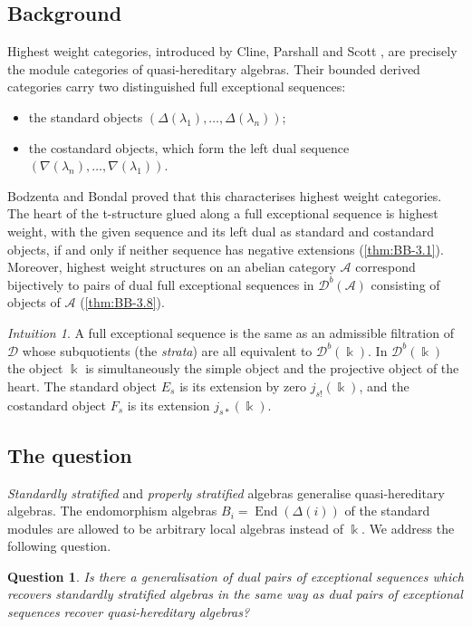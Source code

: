 \documentclass[11pt,reqno]{amsart}
\theoremstyle{plain}
\newtheorem{question}[theorem]{Question}
\theoremstyle{definition}
\theoremstyle{remark}
\newtheorem*{intuition}{Intuition}
\newcommand{\kk}{\Bbbk}
\DeclareMathOperator{\End}{End}
\newcommand{\Db}{\mathcal{D}^b}
\newcommand{\cD}{\mathcal{D}}
\newcommand{\cA}{\mathcal{A}}
\begin{document}
\subsection{Background}
Highest weight categories, introduced by Cline, Parshall and Scott \cite{CPS88}, are precisely the module categories of quasi-hereditary algebras. Their bounded derived categories carry two distinguished full exceptional sequences:
\begin{itemize}
\item the standard objects $(\Delta(\lambda_1),\dots,\Delta(\lambda_n))$;
\item the costandard objects, which form the left dual sequence $(\nabla(\lambda_n),\dots,\nabla(\lambda_1))$.
\end{itemize}
Bodzenta and Bondal \cite{BB26} proved that this characterises highest weight categories. The heart of the t-structure glued along a full exceptional sequence is highest weight, with the given sequence and its left dual as standard and costandard objects, if and only if neither sequence has negative extensions (\cref{thm:BB-3.1}). Moreover, highest weight structures on an abelian category $\cA$ correspond bijectively to pairs of dual full exceptional sequences in $\Db(\cA)$ consisting of objects of $\cA$ (\cref{thm:BB-3.8}).

\begin{intuition}
A full exceptional sequence is the same as an admissible filtration of $\cD$ whose subquotients (the \emph{strata}) are all equivalent to $\Db(\kk)$. In $\Db(\kk)$ the object $\kk$ is simultaneously the simple object and the projective object of the heart. The standard object $E_s$ is its extension by zero $j_{s!}(\kk)$, and the costandard object $F_s$ is its extension $j_{s*}(\kk)$.
\end{intuition}

\subsection{The question}
\emph{Standardly stratified} and \emph{properly stratified} algebras \cite{CPS96,Dla96,AHLU00} generalise quasi-hereditary algebras. The endomorphism algebras $B_i=\End(\Delta(i))$ of the standard modules are allowed to be arbitrary local algebras instead of $\kk$. We address the following question.

\begin{question}\label{q:main}
Is there a generalisation of dual pairs of exceptional sequences which recovers standardly stratified algebras in the same way as dual pairs of exceptional sequences recover quasi-hereditary algebras?
\end{question}
\end{document}
